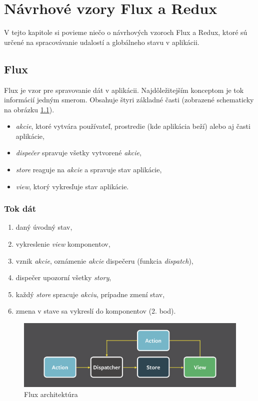 \chapter{Návrhové vzory Flux a Redux}

\label{kap:vzory} %

V tejto kapitole si povieme niečo o návrhových vzoroch Flux a Redux, ktoré sú určené na spracovávanie udalostí a globálneho stavu v aplikácii.

\section{Flux}
\label{sec:flux}
Flux \cite[Overview]{Flux} je vzor pre spravovanie dát v aplikácii. Najdôležitejším konceptom je tok informácií jedným smerom. Obsahuje štyri základné časti (zobrazené schematicky na obrázku \ref{obr:flux}). 
\begin{itemize}
\item \emph{akcie}, ktoré vytvára používateľ, prostredie (kde aplikácia beží) alebo aj časti aplikácie, 
\item \emph{dispečer} spravuje všetky vytvorené \emph{akcie}, 
\item \emph{store} reaguje na \emph{akcie} a spravuje stav aplikácie,
\item \emph{view}, ktorý vykresľuje stav aplikácie.
\end{itemize}

\subsection{Tok dát}
\begin{enumerate}
\item daný úvodný stav,
\item vykreslenie \emph{view} komponentov,
\item vznik \emph{akcie}, oznámenie \emph{akcie} dispečeru (funkcia \emph{dispatch}),
\item dispečer upozorní všetky \emph{story},
\item každý \emph{store} spracuje \emph{akciu}, prípadne zmení stav,
\item zmena v stave sa vykreslí do komponentov (2. bod).
\end{enumerate}

\begin{figure}
  \centering
    \includegraphics[width=\textwidth]{./images/flux.png}
  \caption{Flux architektúra \cite{FluxObr}}\label{obr:flux}
\end{figure}

